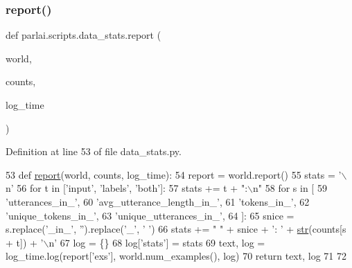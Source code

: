 \subsubsection{\texorpdfstring{report()}{report()}}
{\footnotesize\ttfamily def parlai.\+scripts.\+data\+\_\+stats.\+report (\begin{DoxyParamCaption}\item[{}]{world,  }\item[{}]{counts,  }\item[{}]{log\+\_\+time }\end{DoxyParamCaption})}



Definition at line 53 of file data\+\_\+stats.\+py.


\begin{DoxyCode}
53 \textcolor{keyword}{def }\hyperlink{namespaceparlai_1_1scripts_1_1data__stats_a8cc2308cc735ce6cf029d4c02fea5a21}{report}(world, counts, log\_time):
54     report = world.report()
55     stats = \textcolor{stringliteral}{'\(\backslash\)n'}
56     \textcolor{keywordflow}{for} t \textcolor{keywordflow}{in} [\textcolor{stringliteral}{'input'}, \textcolor{stringliteral}{'labels'}, \textcolor{stringliteral}{'both'}]:
57         stats += t + \textcolor{stringliteral}{":\(\backslash\)n"}
58         \textcolor{keywordflow}{for} s \textcolor{keywordflow}{in} [
59             \textcolor{stringliteral}{'utterances\_in\_'},
60             \textcolor{stringliteral}{'avg\_utterance\_length\_in\_'},
61             \textcolor{stringliteral}{'tokens\_in\_'},
62             \textcolor{stringliteral}{'unique\_tokens\_in\_'},
63             \textcolor{stringliteral}{'unique\_utterances\_in\_'},
64         ]:
65             snice = s.replace(\textcolor{stringliteral}{'\_in\_'}, \textcolor{stringliteral}{''}).replace(\textcolor{stringliteral}{'\_'}, \textcolor{stringliteral}{' '})
66             stats += \textcolor{stringliteral}{"   "} + snice + \textcolor{stringliteral}{': '} + \hyperlink{namespacegenerate__task__READMEs_a5b88452ffb87b78c8c85ececebafc09f}{str}(counts[s + t]) + \textcolor{stringliteral}{'\(\backslash\)n'}
67     log = \{\}
68     log[\textcolor{stringliteral}{'stats'}] = stats
69     text, log = log\_time.log(report[\textcolor{stringliteral}{'exs'}], world.num\_examples(), log)
70     \textcolor{keywordflow}{return} text, log
71 
72 
\end{DoxyCode}
\mbox{\label{namespaceparlai_1_1scripts_1_1data__stats_add47fb96d75895f4c21d9e310cb1df40}} 

